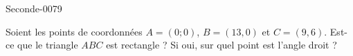 
\begin{corrige}{Seconde-0079}

    Soient les points de coordonnées $A=(0;0)$, \( B=(13,0)\) et \( C=(9,6)\). Est-ce que le triangle \( ABC\) est rectangle ? Si oui, sur quel point est l'angle droit ?

\end{corrige}
